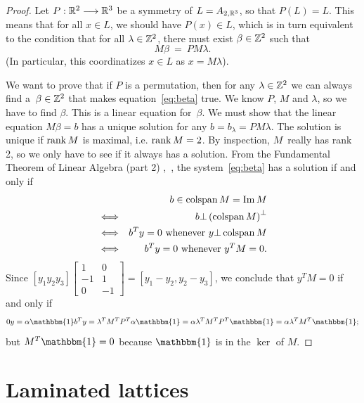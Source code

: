 \begin{proof}
  Let $P:\mathbb{R}^{2}\longrightarrow\mathbb{R}^{3}$ be a symmetry of $L=A_{2,\mathbb{R}^{3}}$, so that
  $P(L)=L$. This means that for all $x\in L$, we should have $P(x)\in L$, which is in turn
  equivalent to the condition that for all $\lambda\in\mathbb{Z}^{2}$, there must exist
  $\beta\in\mathbb{Z}^{2}$ such that
  \begin{equation}\label{eq:beta}
    M\beta
    \ = \
    PM\lambda.
  \end{equation}
  (In particular, this coordinatizes $x\in L$ as $x=M\lambda$).

  We want to prove that if $P$ is a permutation, then for any $\lambda\in\mathbb{Z}^{2}$ we can
  always find a~$\beta\in\mathbb{Z}^2$ that makes equation~\eqref{eq:beta} true.  We know $P$,
  $M$ and $\lambda$, so we have to find $\beta$. This is a linear equation for~$\beta$.
  We must show that the linear equation $M\beta=b$ has a unique solution for any
  $b=b_\lambda =PM\lambda$.  The solution is unique if $\operatorname{rank} M$ is maximal, i.e. $\operatorname{rank}
  M=2$. By inspection, $M$~really has rank 2, so we only have to see if it always has a
  solution.  From the Fundamental Theorem of Linear Algebra (part 2)
  \cite{strang-linear-algebra},~\cite{strang-ftla}, the
  system~\eqref{eq:beta} has a solution if and only if
\begin{eqnarray*}
  && b\in \operatorname{colspan} M=\operatorname{Im} M 
  \\ &\Longleftrightarrow&
  b\bot\left(\operatorname{colspan} M\right)^{\bot}
  \\ &\Longleftrightarrow&
  b^{T}y=0 \text{ whenever } y\bot \operatorname{colspan} M 
  \\ &\Longleftrightarrow&
  b^{T}y=0 \text{ whenever } y^{T}M=0.
\end{eqnarray*}
Since  $\left[y_1 y_2 y_3\right]\left[\begin{smallmatrix}
1 & 0 \\
-1 & 1 \\
0 & -1\end{smallmatrix}\right]=\left[y_1 - y_2, y_2 - y_3\right]$, we conclude that
$y^{T}M=0$ if and only if
\[
0 y=\alpha\mathbbm{1}
b^{T}y=\lambda^{T}M^{T}P^{T}\alpha\mathbbm{1}=\alpha\lambda^{T}M^{T}P^{T}\mathbbm{1}=\alpha\lambda^{T}M^{T}\mathbbm{1};
\]
but $M^{T}\mathbbm{1}=0$ because $\mathbbm{1}$ is in the $\ker$ of $M$.
\end{proof}


\section{Laminated lattices}


